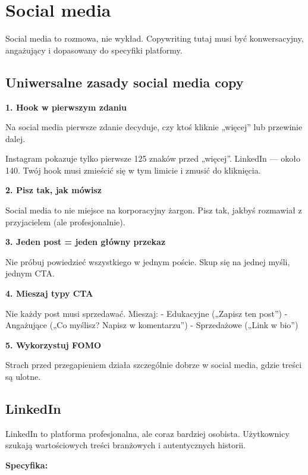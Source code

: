 \documentclass[
  12pt,
  a4paper,
  twoside,
  openright,
  12pt,
  DIV=12,
  BCOR=12mm]{scrbook}
\begin{document}
\section{Social media}\label{social-media}

Social media to rozmowa, nie wykład. Copywriting tutaj musi być
konwersacyjny, angażujący i dopasowany do specyfiki platformy.

\subsection{Uniwersalne zasady social media
copy}\label{uniwersalne-zasady-social-media-copy}

\textbf{1. Hook w pierwszym zdaniu}

Na social media pierwsze zdanie decyduje, czy ktoś kliknie „więcej'' lub
przewinie dalej.

\begin{wskazowka}
Instagram pokazuje tylko pierwsze 125 znaków przed „więcej''. LinkedIn --- około 140. Twój hook musi zmieścić się w tym limicie i zmusić do kliknięcia.
\end{wskazowka}

\textbf{2. Pisz tak, jak mówisz}

Social media to nie miejsce na korporacyjny żargon. Pisz tak, jakbyś
rozmawiał z przyjacielem (ale profesjonalnie).

\textbf{3. Jeden post = jeden główny przekaz}

Nie próbuj powiedzieć wszystkiego w jednym poście. Skup się na jednej
myśli, jednym CTA.

\textbf{4. Mieszaj typy CTA}

Nie każdy post musi sprzedawać. Mieszaj: - Edukacyjne („Zapisz ten
post'') - Angażujące („Co myślisz? Napisz w komentarzu'') - Sprzedażowe
(„Link w bio'')

\textbf{5. Wykorzystuj FOMO}

Strach przed przegapieniem działa szczególnie dobrze w social media,
gdzie treści są ulotne.

\subsection{LinkedIn}\label{linkedin}

LinkedIn to platforma profesjonalna, ale coraz bardziej osobista.
Użytkownicy szukają wartościowych treści branżowych i autentycznych
historii.

\textbf{Specyfika:}
\end{document}
